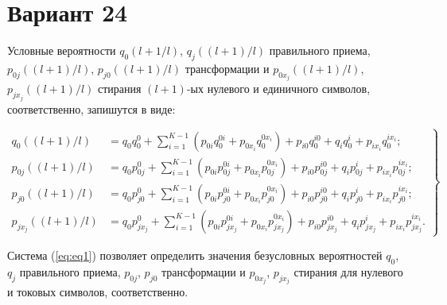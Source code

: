 \documentclass{article}
\begin{document}
\section*{Вариант 24}

Условные вероятности $q_0(l+1/l)$, $q_j((l+1)/l)$ правильного приема, $p_{0j}((l+1)/l)$, $p_{j0}((l+1)/l)$ трансформации и $p_{0x_j}((l+1)/l)$, $p_{jx_j}((l+1)/l)$ стирания $(l+1)$-ых нулевого и единичного символов, соответственно, запишутся в виде:

\begin{equation}
  \label{eq:eq1}
  \left.
  \begin{aligned}
    q_0((l+1)/l) &= q_0 q_0^0 + \sum_{i=1}^{K-1} \left( p_{0i} q_0^{0i} + p_{0x_i} q_0^{0x_i} \right) + p_{i0} q_0^{i0} + q_i q_0^i + p_{ix_i} q_0^{ix_i}; \\
    p_{0j}((l+1)/l) &= q_0 p_{0j}^0 + \sum_{i=1}^{K-1} \left( p_{0i} p_{0j}^{0i} + p_{0x_i} p_{0j}^{0x_i} \right) + p_{i0} p_{0j}^{i0} + q_i p_{0j}^i + p_{ix_i} p_{0j}^{ix_i}; \\
    p_{j0}((l+1)/l) &= q_0 p_{j0}^0 + \sum_{i=1}^{K-1} \left( p_{0i} p_{j0}^{0i} + p_{0x_i} p_{j0}^{0x_i} \right) + p_{i0} p_{j0}^{i0} + q_i p_{j0}^i + p_{ix_i} p_{j0}^{ix_i}; \\
    p_{jx_j}((l+1)/l) &= q_0 p_{jx_j}^0 + \sum_{i=1}^{K-1} \left( p_{0i} p_{jx_j}^{0i} + p_{0x_i} p_{jx_j}^{0x_i} \right) + p_{i0} p_{jx_j}^{i0} + q_i p_{jx_j}^i + p_{ix_i} p_{jx_j}^{ix_i}.
  \end{aligned}
  \right\}
\end{equation}

Система (\ref{eq:eq1}) позволяет определить значения безусловных вероятностей $q_0$, $q_j$ правильного приема, $p_{0j}$, $p_{j0}$ трансформации и $p_{0x_j}$, $p_{jx_j}$ стирания для нулевого и токовых символов, соответственно.
\end{document}
